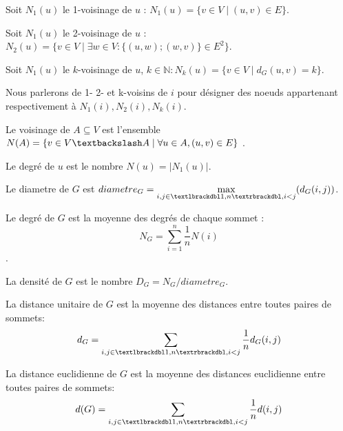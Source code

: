 \begin{mydef}
Soit $N_1(u)$ le 1-voisinage de $u$ : $N_1(u) = \{ v \in V  \mid (u,v) \in E \}$.
\end{mydef}
\begin{mydef}
Soit $N_1(u)$ le 2-voisinage de $u$ : $N_2(u) = \{ v \in V \mid  \exists w \in V :\{(u,w);(w,v)\} \in E ^2\}$.
\end{mydef}
\begin{mydef}
Soit $N_1(u)$ le $k$-voisinage de $u$, $k \in \mathbb{N} : N_k(u) = \{ v \in V  \mid d_G(u,v)=k \}$.
\end{mydef}
\begin{myvoc}
Nous parlerons de 1- 2- et k-voisins de $i$ pour désigner des noeuds appartenant respectivement
 à $N_1(i), N_2(i),N_k(i)$. 
\end{myvoc}
\begin{mydef}
Le voisinage de  $A \subseteq V$ est l'ensemble $N(A) = \{ v \in V\textbackslash  A \mid \forall u\in A,(u,v) \in E \}$ .
\end{mydef}
\begin{mydef}
Le degré de $ u $ est le nombre  $N(u)=|N_1(u)|$.
\end{mydef}

\begin{mydef}
Le diametre de $G$ est  $diametre_G= \max\limits_{i,j\in \textlbrackdbl 1,n \textrbrackdbl,i<j} (d_G(i,j))$.
\end{mydef}
 

\begin{mydef}
 Le degré de $G$ est la moyenne des degrés de chaque sommet : $$N_G=\sum_{i=1}^n{\frac1n N(i)}$$.
\end{mydef}
\begin{mydef}
 La densité de $G$ est le nombre $D_G=N_G/diametre_G$.
\end{mydef}
\begin{mydef}
 La distance unitaire de $G$ est la moyenne des distances entre toutes paires de sommets:$$d_G=\sum_{i,j\in \textlbrackdbl 1,n \textrbrackdbl,i<j}{\frac1n d_G(i,j)}$$
\end{mydef}
\begin{mydef}
 La distance euclidienne de $G$ est la moyenne des distances euclidienne entre toutes paires de sommets:$$d(G)=\sum_{i,j\in \textlbrackdbl 1,n \textrbrackdbl,i<j}{\frac1n d(i,j)}$$
\end{mydef}

